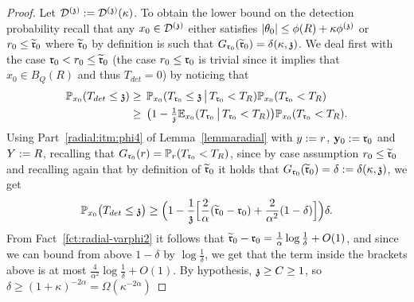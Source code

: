 \begin{proof}
Let $\dt:=\dt(\kappa)$.
To obtain the lower bound on the detection probability recall that any $x_0\in\dt$ either satisfies $|\theta_0|\leq\phi(R)+\kappa\phi^{(\ss)}$ or $r_0\leq \widetilde{\rabs}_0$ where $\widetilde{\rabs}_0$ by definition is such that $G_{\rabs_0}(\widetilde{\rabs}_0)=\delta(\kappa,\ss)$. We deal first with the case $\rabs_0<r_0\leq \widetilde{\rabs}_0$ (the case $r_0\leq \rabs_0$ is trivial since it implies that $x_0\in B_Q(R)$ and thus $T_{det}=0$) by noticing that %
\begin{align*}\P_{x_0}(T_{det}\leq \ss)&\geq\,\P_{x_0}(T_{\rabs_0}\leq \ss\,\big|\,T_{\rabs_0}<T_{R})\P_{x_0}(T_{\rabs_0}<T_{R})\\&\geq\,\big(1-\tfrac{1}{\ss}\EE_{x_0}(T_{\rabs_0}\,\big|\,T_{\rabs_0}<T_{R})\big)\P_{x_0}(T_{\rabs_0}<T_{R}).
\end{align*}
Using Part~\eqref{radial:itm:phi4} of Lemma~\ref{lemmaradial} with $\auxy:=r$, $\yabs_0:=\rabs_0$ and $\auxY:=R$, recalling that $G_{\rabs_0}(r)=\P_{r}(T_{\rabs_0}<T_{R})$, since by case assumption $r_0\leq\widetilde{\rabs}_0$ and recalling again that by definition of $\widetilde{\rabs}_0$ it holds that $G_{\rabs_0}(\widetilde{\rabs}_0)=\delta:=\delta(\kappa,\ss)$, we get
\[
\P_{x_0}\big(T_{det}\leq \ss\big)\geq 
  \Big(1-\frac{1}{\ss}\Big[\frac{2}{\alpha}(\widetilde{\rabs}_0-\rabs_0)+\frac{2}{\alpha^2}(1-\delta)\Big]\Big)\delta.
\]
From Fact~\ref{fct:radial-varphi2} it follows that $\widetilde{\rabs}_0-\rabs_0=\frac{1}{\alpha}\log \tfrac{1}{\delta}+O(1)$, and since we can bound from above $1-\delta$ by $\log\tfrac{1}{\delta}$, we get that the term inside the brackets above is at most $\frac{4}{\alpha^2}\log\frac{1}{\delta}+O(1)$. By hypothesis, $\ss\ge C\ge 1$, so $\delta\geq (1+\kappa)^{-2\alpha}=\Omega(\kappa^{-2\alpha})$ %

\end{proof}
